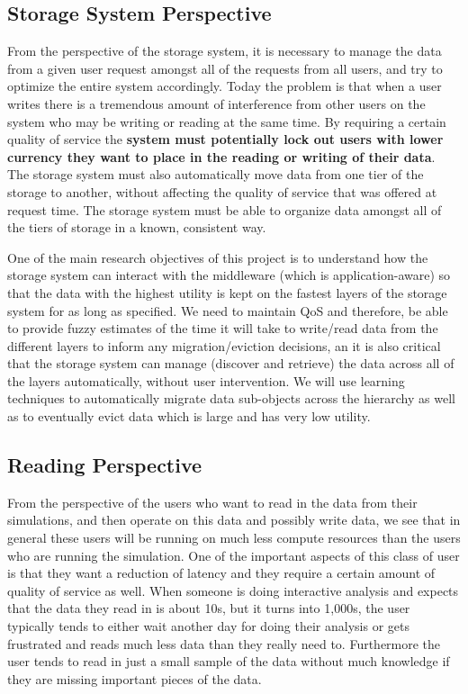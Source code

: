 \subsection{Storage System Perspective}
\label{subsec:storage-perspective}
From the perspective of the storage system, it is necessary to manage the data from
a given user request amongst all of the requests from all users, and try to optimize the
entire system accordingly. Today the problem is that when a user writes there is a
tremendous amount of interference from other users on the system who may be
writing or reading at the same time. By requiring a certain quality
of service the {\bf {\color {red} system must potentially lock out users with lower currency
they want to place in the reading or writing of their data}}. The storage
system must also automatically move data from one tier of the storage to
another, without affecting the quality of service that was offered at request
time. The storage system must be able to organize
data amongst all of the tiers of storage in a known, consistent way.

One of the main research objectives of this project is to understand how the
storage system can interact with the middleware (which is application-aware)  so
that the data with the highest utility is kept on the fastest layers of the
storage system for as long as specified. We need to maintain 
QoS and therefore, be able to provide fuzzy estimates of the time it will take to write/read data from
the different layers to inform any migration/eviction decisions, an it
is also critical that the storage system can manage (discover and retrieve) the data across all of the
layers automatically, without user intervention. We will use learning techniques to automatically migrate data
sub-objects across the hierarchy as well as to eventually evict data which is
large and has very low utility.


\subsection{Reading  Perspective}
\label{subsec:reading-perspective}
From the perspective of the users who want to read in the data from their
simulations, and then operate on this data and possibly write data, we see
that in general these users will be running on much less compute resources
than the users who are running the simulation. One of the important aspects
of this class of user is that they want a reduction of latency and they
require a certain amount of quality of service as well. When someone is
doing interactive analysis and expects that the data they read in is about
10s, but it turns into 1,000s, the user typically tends to either wait
another day for doing their analysis or gets frustrated and reads much less
data than they really need to. Furthermore the user tends to read in just a
small sample of the data without much knowledge if they are missing
important pieces of the data.

